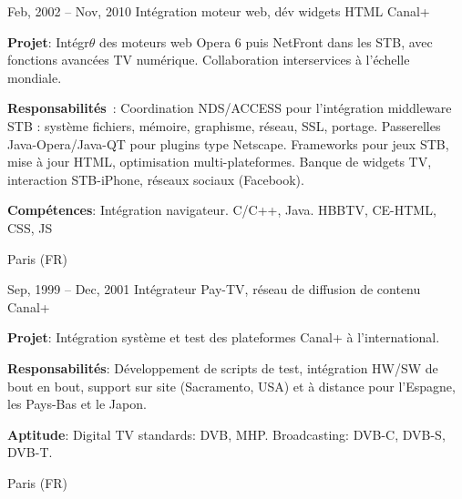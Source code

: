 \documentclass[
  a4paper,
   maincolor=cvblue,
   sectioncolor=cvblue,
   sidebarwidth=0.323\paperwidth,
]{fortysecondscv}
\begin{document}
\begin{cvtableNew}
  \cvitemRightNew
  {Feb, 2002 – Nov, 2010} %
  {Intégration moteur web, dév widgets HTML} %
  {Canal+} %
  {
    \vspace{1pt}
    \fontsize{10.8pt}{12pt}\selectfont %
    \textbf{Projet}: Intégr$\theta$ des moteurs web Opera 6 puis NetFront dans les STB, avec fonctions avancées TV numérique. Collaboration interservices à l’échelle mondiale.\par
    \vspace{4pt}
    \textbf{Responsabilités}~: Coordination NDS/ACCESS pour l’intégration middleware STB : système fichiers, mémoire, graphisme, réseau, SSL, portage. Passerelles Java-Opera/Java-QT pour plugins type Netscape. Frameworks pour jeux STB, mise à jour HTML, optimisation multi-plateformes. Banque de widgets TV, interaction STB-iPhone, réseaux sociaux (Facebook).\par
    \vspace{4pt}
    \textbf{Compétences}: Intégration navigateur. C/C++, Java. HBBTV, CE-HTML, CSS, JS\par
  }
    {Paris (FR)} %

    \vspace{1.57mm} %

  \cvitemRightNew
    {Sep, 1999 – Dec, 2001} %
    {Intégrateur Pay-TV, réseau de diffusion de contenu} %
    {Canal+} %
    {
      \vspace{1pt}
      \fontsize{10.8pt}{12pt}\selectfont %
      \textbf{Projet}: Intégration système et test des plateformes Canal+ à l’international.\par
      \vspace{4pt}
      \textbf{Responsabilités}: Développement de scripts de test, intégration HW/SW de bout en bout, support sur site (Sacramento, USA) et à distance pour l’Espagne, les Pays-Bas et le Japon.\par
      \vspace{4pt}
      \textbf{Aptitude}: Digital TV standards: DVB, MHP. Broadcasting: DVB-C, DVB-S, DVB-T.\par
    }
    {Paris (FR)} %

    \vspace{1.87mm} %


\end{cvtableNew}
\end{document}
